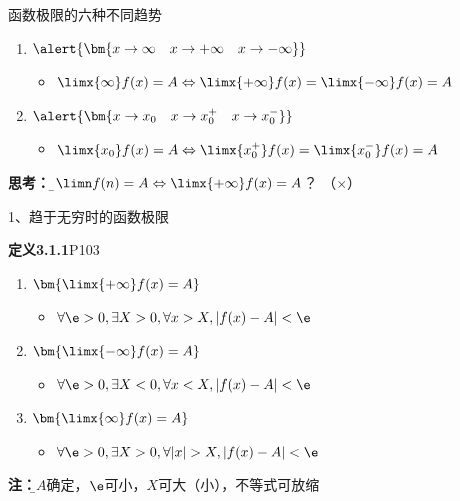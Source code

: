 \begin{frame}{函数极限的六种不同趋势}
	\linespread{2}\pause
	\begin{enumerate}
	  \item $\alert{\bm{x\to\infty\quad x\to+\infty\quad x\to -\infty}}$
	  \pause
	  \begin{itemize}
	    \item
	    $\limx{\infty}f(x)=A\Leftrightarrow\limx{+\infty}
	    f(x)=\limx{-\infty}f(x)=A$
	    \pause
	  \end{itemize}
	  \item $\alert{\bm{x\to x_0\quad x\to {x_0^+}
	  \quad x\to {x_0^-}}}$
	  \pause
	  \begin{itemize}
	    \item
	    $\limx{x_0}f(x)=A\Leftrightarrow\limx{x_0^+}f(x)=\limx{x_0^-}
	    f(x)=A$\pause
	  \end{itemize}
	\end{enumerate}
	\alert{\bf 思考：}
	{\b $\limn f(n)=A\Leftrightarrow\limx{+\infty}f(x)=A$？}\pause
	（\alert{$\times$}）
\end{frame}

\begin{frame}{1、趋于无穷时的函数极限}
	\linespread{1.2}\pause 
	\begin{block}{{\bf 定义3.1.1}\hfill P103}
		\begin{enumerate}
		  \item $\bm{\limx{+\infty}f(x)=A}$\pause 
		  \begin{itemize}
		    \item $\forall\e>0,\exists X>0,\forall x>X,|f(x)-A|<\e$\pause 
		  \end{itemize}
		  \item $\bm{\limx{-\infty}f(x)=A}$\pause 
		  \begin{itemize}
		    \item $\forall\e>0,\exists X<0,\forall x<X,|f(x)-A|<\e$\pause 
		  \end{itemize}
		  \item $\bm{\limx{\infty}f(x)=A}$\pause 
		  \begin{itemize}
		    \item $\forall\e>0,\exists X>0,\forall |x|>X,|f(x)-A|<\e$
		  \end{itemize}
		\end{enumerate}
	\end{block}\pause 
	{\bf 注：}{\b $A$确定，$\e$可小，$X$可大（小），不等式可放缩}
\end{frame}

